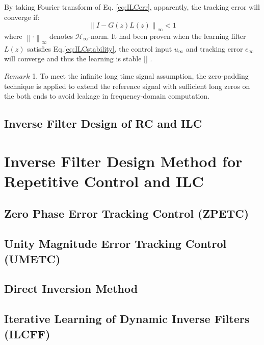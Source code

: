 \documentclass[a4paper, 12pt, twoside, openright]{mythesis}
\begin{document}
By taking Fourier transform of Eq. \ref{eq:ILCerr}, apparently, the tracking error will converge if:
\begin{equation}
\left \| I-G(z)L(z) \right \|_\infty<1
\label{eq:ILCstability}
\end{equation}
where $\left \| \cdot  \right \|_\infty$ denotes $\mathcal{H}_\infty$-norm. It had been proven when the learning filter $L(z)$ satisfies Eq.\ref{eq:ILCstability}, the control input $u_\infty$ and tracking error $e_\infty$ will converge and thus the learning is stable [\cite{norrlof2002time}] . 

{$Remark$ 1.}
To meet the infinite long time signal assumption, the zero-padding technique is applied to extend the reference signal with sufficient long zeros on the both ends to avoid leakage in frequency-domain computation.   


\subsection{Inverse Filter Design of RC and ILC}
\label{sec: Inverse Filter Design of RC and ILC}


\section{Inverse Filter Design Method for Repetitive Control and ILC}

\subsection{Zero Phase Error Tracking Control (ZPETC)}
\label{sec: Zero Phase Error Tracking Control (ZPETC)}

\subsection{Unity Magnitude Error Tracking Control (UMETC)}
\label{sec: Unity Magnitude Error Tracking Control (UMETC)}

\subsection{Direct Inversion Method}
\label{sec: Direct Inversion Method}

\subsection{Iterative Learning of Dynamic Inverse Filters (ILCFF)}
\label{sec: Iterative Learning of Dynamic Inverse Filters (ILCFF)}
\end{document}
